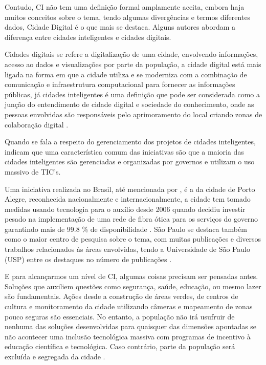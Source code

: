 Contudo, CI não tem uma definição formal amplamente aceita, embora haja muitos conceitos sobre o tema, tendo algumas divergências e termos diferentes dados, Cidade Digital é o que mais se destaca. Alguns autores abordam a diferença entre cidades inteligentes e cidades digitais.

Cidades digitais se refere a digitalização de uma cidade, envolvendo informações, acesso ao dados e visualizações por parte da população, a cidade digital está mais ligada na forma em que a cidade utiliza e se moderniza com a combinação de comunicação e infraestrutura computacional para fornecer as informações públicas, já cidades inteligentes é uma definição que pode ser considerada como a junção do entendimento de cidade digital e sociedade do conhecimento, onde as pessoas envolvidas são responsáveis pelo aprimoramento do local criando zonas de colaboração digital \cite{yin}.

Quando se fala a respeito do gerenciamento dos projetos de cidades inteligentes,  indicam que uma característica comum das iniciativas são que a maioria das cidades inteligentes são gerenciadas e organizadas por governos e utilizam o uso massivo de TIC’s. 

Uma iniciativa realizada no Brasil, até mencionada por , é a da cidade de Porto Alegre, reconhecida nacionalmente e internacionalmente, a cidade tem tomado medidas usando tecnologia para o auxílio desde 2006 quando decidiu investir pesado na implementação de uma rede de fibra ótica para os serviços do governo garantindo mais de 99.8 \% de disponibilidade \cite{weiss}. São Paulo se destaca também como o maior centro de pesquisa sobre o tema, com muitas publicações e diversos trabalhos relacionados às áreas envolvidas, tendo a Universidade de São Paulo (USP) entre os destaques no número de publicações \cite{lazzaretti}. 


E para alcançarmos um nível de CI, algumas coisas precisam ser pensadas antes. Soluções que auxiliem questões como segurança, saúde, educação, ou mesmo lazer são fundamentais. Ações desde a construção de áreas verdes, de centros de cultura e monitoramento da cidade utilizando câmeras e mapeamento de zonas pouco seguras são essenciais. No entanto, a população não irá usufruir de nenhuma das soluções desenvolvidas para quaisquer das dimensões apontadas se não acontecer uma inclusão tecnológica massiva com programas de incentivo à educação científica e tecnológica. Caso contrário, parte da população será excluída e segregada da cidade \cite{patricia}.


